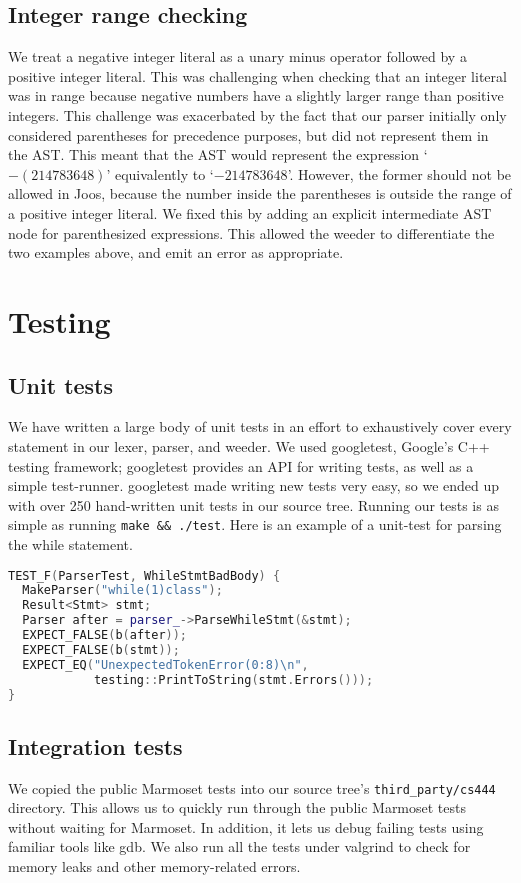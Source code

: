 \documentclass[12pt, titlepage]{article}
\begin{document}
\subsection{Integer range checking}
We treat a negative integer literal as a unary minus operator followed by a
positive integer literal. This was challenging when checking that an integer
literal was in range because negative numbers have a slightly larger range than
positive integers. This challenge was exacerbated by the fact that our parser
initially only considered parentheses for precedence purposes, but did not
represent them in the AST. This meant that the AST would represent the
expression `$-(214783648)$' equivalently to `$-214783648$'. However, the former
should not be allowed in Joos, because the number inside the parentheses is
outside the range of a positive integer literal. We fixed this by adding an
explicit intermediate AST node for parenthesized expressions. This allowed the
weeder to differentiate the two examples above, and emit an error as
appropriate.

\newpage

\section{Testing}
\subsection{Unit tests}
We have written a large body of unit tests in an effort to exhaustively cover
every statement in our lexer, parser, and weeder. We used googletest, Google's
C++ testing framework; googletest provides an API for writing tests, as well as
a simple test-runner. googletest made writing new tests very easy, so we ended
up with over 250 hand-written unit tests in our source tree. Running our tests
is as simple as running \verb+make && ./test+. Here is an example of a
unit-test for parsing the while statement.

\begin{lstlisting}[language=c++]
TEST_F(ParserTest, WhileStmtBadBody) {
  MakeParser("while(1)class");
  Result<Stmt> stmt;
  Parser after = parser_->ParseWhileStmt(&stmt);
  EXPECT_FALSE(b(after));
  EXPECT_FALSE(b(stmt));
  EXPECT_EQ("UnexpectedTokenError(0:8)\n",
            testing::PrintToString(stmt.Errors()));
}
\end{lstlisting}

\subsection{Integration tests}
We copied the public Marmoset tests into our source tree's
\verb+third_party/cs444+ directory. This allows us to quickly run through the
public Marmoset tests without waiting for Marmoset. In addition, it lets us
debug failing tests using familiar tools like gdb. We also run all the tests
under valgrind to check for memory leaks and other memory-related errors.
\end{document}
